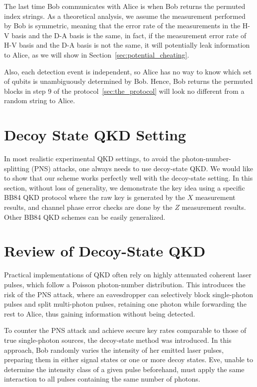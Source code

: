 \documentclass[%
 reprint,
superscriptaddress,
 amsmath,amssymb,
 aps,
]{revtex4-2}
\begin{document}
The last time Bob communicates with Alice is when Bob returns the permuted index strings. As a theoretical analysis, we assume the measurement performed by Bob is symmetric, meaning that the error rate of the measurements in the H-V basis and the D-A basis is the same, in fact, if the measurement error rate of H-V basis and the D-A basis is not the same, it will potentially leak information to Alice, as we will show in Section~\ref{sec:potential_cheating}.

Also, each detection event is independent, so Alice has no way to know which set of qubits is unambiguously determined by Bob. Hence, Bob returns the permuted blocks in step 9 of the protocol~\ref{sec:the_protocol} will look no different from a random string to Alice.

\section{Decoy State QKD Setting}
In most realistic experimental QKD settings, to avoid the photon-number-splitting (PNS) attacks, one always needs to use decoy-state QKD. We would like to show that our scheme works perfectly well with the decoy-state setting. In this section, without loss of generality, we demonstrate the key idea using a specific BB84 QKD protocol where the raw key is generated by the $X$ measurement results, and channel phase error checks are done by the $Z$ measurement results. Other BB84 QKD schemes can be easily generalized.

\section{Review of Decoy-State QKD}
\label{sec:review_decoy_state_qkd}

Practical implementations of QKD often rely on highly attenuated coherent laser pulses, which follow a Poisson photon-number distribution. This introduces the risk of the PNS attack, where an eavesdropper can selectively block single-photon pulses and split multi-photon pulses, retaining one photon while forwarding the rest to Alice, thus gaining information without being detected.

To counter the PNS attack and achieve secure key rates comparable to those of true single-photon sources, the decoy-state method was introduced. In this approach, Bob randomly varies the intensity of her emitted laser pulses, preparing them in either signal states or one or more decoy states. Eve, unable to determine the intensity class of a given pulse beforehand, must apply the same interaction to all pulses containing the same number of photons.
\end{document}
